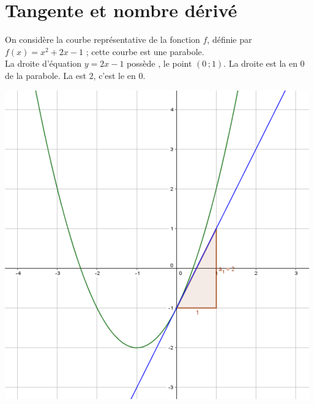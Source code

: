 \documentclass[12pt,a4paper]{article}
\date{}
\title{}
\begin{document}
	
	\section{Tangente et nombre dérivé}
	
	
	\begin{myprops}
	\begin{multicols}{2}
		

	
	
	
	On considère la courbe représentative de la fonction $f$, définie par $f(x) = x^2 + 2x - 1$ ; cette courbe est une parabole.\\
	
	
	La droite d'équation $y = 2x - 1$ possède , le point $(0\, ; 1)$. La droite est la  en 0 de la parabole.
	La  est $2$, c'est le  en 0. 
	
	\includegraphics[scale=0.5]{./img/ex}
	\end{multicols}
	\end{myprops}
	
\end{document}
